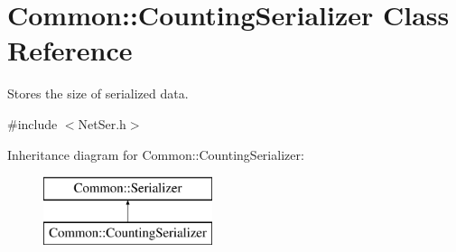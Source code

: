 \hypertarget{class_common_1_1_counting_serializer}{\section{Common\-:\-:Counting\-Serializer Class Reference}
\label{class_common_1_1_counting_serializer}
}


Stores the size of serialized data.  




{\ttfamily \#include $<$Net\-Ser.\-h$>$}

Inheritance diagram for Common\-:\-:Counting\-Serializer\-:\begin{figure}[H]
\begin{center}
\leavevmode
\includegraphics[height=2.000000cm]{class_common_1_1_counting_serializer}
\end{center}
\end{figure}
